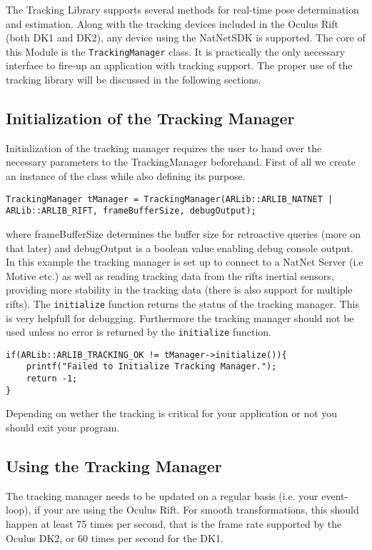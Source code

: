 The Tracking Library supports several methods for real-time pose determination and estimation. Along with the tracking devices included in the Oculus Rift (both DK1 and DK2), any device using the NatNetSDK is supported. The core of this Module is the \texttt{TrackingManager} class. It is practically the only necessary interface to fire-up an application with tracking support. The proper use of the tracking library will be discussed in the following sections.
\subsection{Initialization of the Tracking Manager}\label{tracking-manager-initialization}

Initialization of the tracking manager requires the user to hand over the necessary parameters to the TrackingManager beforehand. First of all we create an instance of the class while also defining its purpose.

\begin{lstlisting}
TrackingManager tManager = TrackingManager(ARLib::ARLIB_NATNET | ARLib::ARLIB_RIFT, frameBufferSize, debugOutput);
\end{lstlisting}
where frameBufferSize determines the buffer size for retroactive queries (more on that later) and debugOutput is a boolean value enabling debug console output. In this example the tracking manager is set up to connect to a NatNet Server (i.e Motive etc.) as well as reading tracking data from the rifts inertial sensors, providing more stability in the tracking data (there is also support for multiple rifts).
The \texttt{initialize} function returns the status of the tracking manager. This is very helpfull for debugging. Furthermore the tracking manager should not be used unless no error is returned by the \texttt{initialize} function.

\begin{lstlisting}
if(ARLib::ARLIB_TRACKING_OK != tManager->initialize()){
    printf("Failed to Initialize Tracking Manager.");
    return -1;
}
\end{lstlisting}
Depending on wether the tracking is critical for your application or not you should exit your program.

\subsection{Using the Tracking Manager}\label{using-the-tracking-manager}

The tracking manager needs to be updated on a regular basis (i.e. your event-loop), if your are using the Oculus Rift. For smooth transformations, this should happen at least 75 times per second, that is the frame rate supported by the Oculus DK2, or 60 times per second for the DK1.

